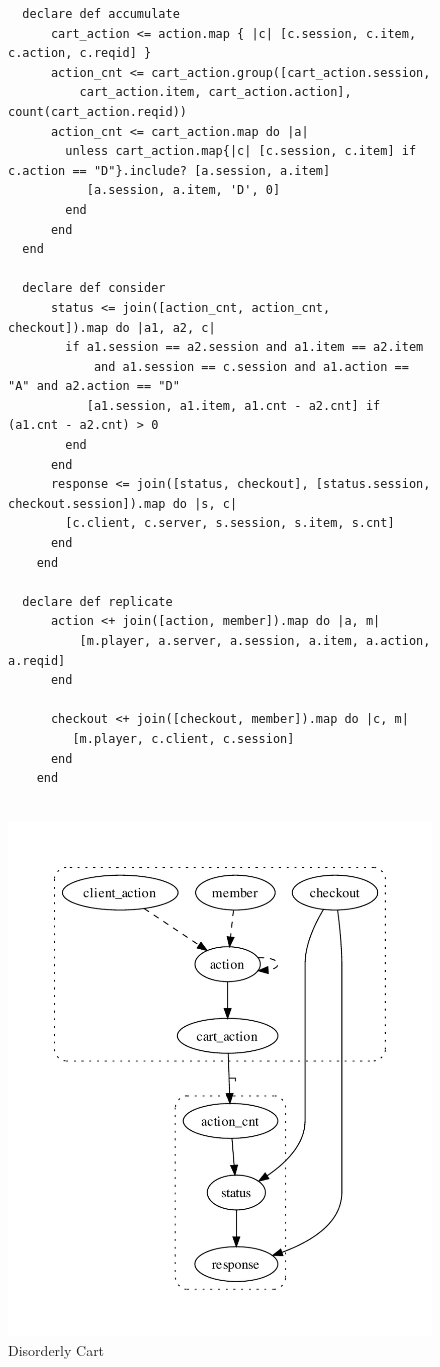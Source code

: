 \begin{figure}[t]
\begin{tiny}
\begin{verbatim}
  declare def accumulate 
      cart_action <= action.map { |c| [c.session, c.item, c.action, c.reqid] }
      action_cnt <= cart_action.group([cart_action.session, 
          cart_action.item, cart_action.action], count(cart_action.reqid))
      action_cnt <= cart_action.map do |a| 
        unless cart_action.map{|c| [c.session, c.item] if c.action == "D"}.include? [a.session, a.item] 
           [a.session, a.item, 'D', 0]
        end 
      end
  end

  declare def consider
      status <= join([action_cnt, action_cnt, checkout]).map do |a1, a2, c| 
        if a1.session == a2.session and a1.item == a2.item 
            and a1.session == c.session and a1.action == "A" and a2.action == "D"
           [a1.session, a1.item, a1.cnt - a2.cnt] if (a1.cnt - a2.cnt) > 0
        end
      end
      response <= join([status, checkout], [status.session, checkout.session]).map do |s, c| 
        [c.client, c.server, s.session, s.item, s.cnt]
      end
    end

  declare def replicate
      action <+ join([action, member]).map do |a, m|
          [m.player, a.server, a.session, a.item, a.action, a.reqid]
      end

      checkout <+ join([checkout, member]).map do |c, m|
         [m.player, c.client, c.session]
      end
    end


\end{verbatim}
\end{tiny}

\centering
\includegraphics[width=0.7\linewidth]{fig/BasicCartServer_gvoutput.pdf}
\caption{Disorderly Cart}
\label{fig:pdg-disorderly}
\end{figure}






